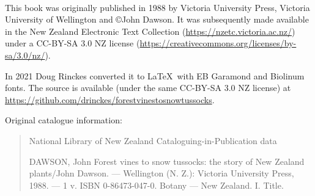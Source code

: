 \thispagestyle{empty}

~\vfill

This book was originally published in 1988 by Victoria University Press, Victoria University of Wellington and ©John Dawson.
It was subsequently made available in the New Zealand Electronic Text Collection (\url{https://nzetc.victoria.ac.nz/}) under a CC-BY-SA 3.0 NZ license (\url{https://creativecommons.org/licenses/by-sa/3.0/nz/}).

In 2021 Doug Rinckes converted it to \LaTeX\, with EB Garamond and Biolinum fonts.
The source is available (under the same CC-BY-SA 3.0 NZ license) at \url{https://github.com/drinckes/forestvinestosnowtussocks}.

Original catalogue information:

\begin{quote}
	National Library of New Zealand\newline
	Cataloguing-in-Publication data

	DAWSON, John\newline
	Forest vines to snow tussocks: the story of New Zealand plants/John Dawson. --- Wellington (N. Z.): Victoria University Press, 1988. --- 1 v.\newline
	ISBN 0-86473-047-0. Botany --- New Zealand. I. Title.\newline
\end{quote}
